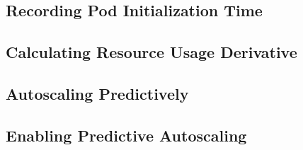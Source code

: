 \subsection{Recording Pod Initialization Time}



\subsection{Calculating Resource Usage Derivative}



\subsection{Autoscaling Predictively}



\subsection{Enabling Predictive Autoscaling}


